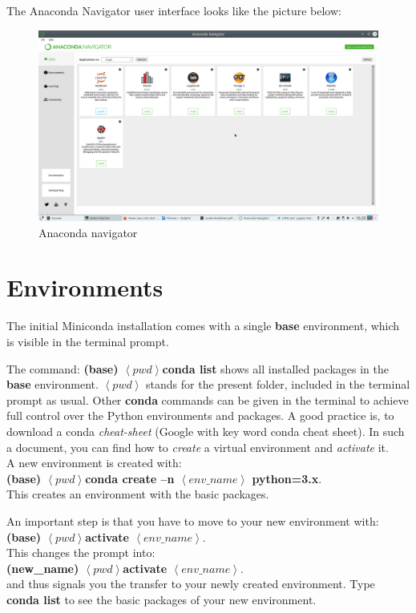 \documentclass[a4paper,10pt]{article}
\begin{document}
The Anaconda Navigator user interface looks like the picture below:

\vspace{5mm}

\begin{figure}[H]
\centering
\includegraphics[width=1\columnwidth]{Pictures/Anaconda_navigator.png}
\caption[Short title]{Anaconda navigator}
\label{fig:Navigator}\end{figure}

\vspace{5mm}

\section{Environments}

The initial Miniconda installation comes with a single \textbf{base} environment, which is visible in the terminal prompt.

The command: \textbf{(base) $\left<pwd\right>$conda list} shows all installed packages in the \textbf{base} environment. $\left<pwd\right>$ stands for the present folder, included in the terminal prompt as usual.
Other \textbf{conda} commands can be given in the terminal to achieve full control over the Python environments and packages. A good practice is, to download a conda \emph{cheat-sheet} (Google with key word conda cheat sheet). In such a document, you can find how to \emph{create} a virtual environment and \emph{activate} it.\\
A new environment is created with:\\ 
\textbf{(base) $\left<pwd\right>$conda create –n $\left<env\_name\right>$ python=3.x}.\\ 
This creates an environment with the basic packages.

An important step is that you have to move to your new environment with:
\textbf{(base) $\left<pwd\right>$activate $\left<env\_name\right>$}.\\  
This changes the prompt into:\\
\textbf{(new\_name) $\left<pwd\right>$activate $\left<env\_name\right>$}.\\
and thus signals you the transfer to your newly created environment.
Type \textbf{conda list} to see the basic packages of your new environment.\\
\end{document}
